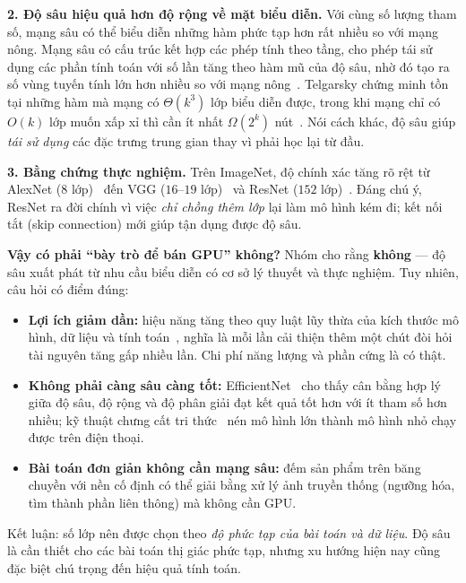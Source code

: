 \textbf{2. Độ sâu hiệu quả hơn độ rộng về mặt biểu diễn.} Với cùng số lượng tham số, mạng sâu có thể biểu diễn những hàm phức tạp hơn rất nhiều so với mạng nông. Mạng sâu có cấu trúc kết hợp các phép tính theo tầng, cho phép tái sử dụng các phần tính toán với số lần tăng theo hàm mũ của độ sâu, nhờ đó tạo ra số vùng tuyến tính lớn hơn nhiều so với mạng nông~\citep{montufar2014number}. Telgarsky chứng minh tồn tại những hàm mà mạng có $\Theta(k^3)$ lớp biểu diễn được, trong khi mạng chỉ có $O(k)$ lớp muốn xấp xỉ thì cần ít nhất $\Omega(2^k)$ nút~\citep{telgarsky2016benefits}. Nói cách khác, độ sâu giúp \emph{tái sử dụng} các đặc trưng trung gian thay vì phải học lại từ đầu.

\textbf{3. Bằng chứng thực nghiệm.} Trên ImageNet, độ chính xác tăng rõ rệt từ AlexNet ($8$ lớp)~\citep{krizhevsky2012imagenet} đến VGG ($16$--$19$ lớp)~\citep{simonyan2015very} và ResNet ($152$ lớp)~\citep{he2016deep}. Đáng chú ý, ResNet ra đời chính vì việc \emph{chỉ chồng thêm lớp} lại làm mô hình kém đi; kết nối tắt (skip connection) mới giúp tận dụng được độ sâu.

\textbf{Vậy có phải ``bày trò để bán GPU'' không?} Nhóm cho rằng \textbf{không} — độ sâu xuất phát từ nhu cầu biểu diễn có cơ sở lý thuyết và thực nghiệm. Tuy nhiên, câu hỏi có điểm đúng:
\begin{itemize}
    \item \textbf{Lợi ích giảm dần:} hiệu năng tăng theo quy luật lũy thừa của kích thước mô hình, dữ liệu và tính toán~\citep{kaplan2020scaling}, nghĩa là mỗi lần cải thiện thêm một chút đòi hỏi tài nguyên tăng gấp nhiều lần. Chi phí năng lượng và phần cứng là có thật.
    \item \textbf{Không phải càng sâu càng tốt:} EfficientNet~\citep{tan2019efficientnet} cho thấy cân bằng hợp lý giữa độ sâu, độ rộng và độ phân giải đạt kết quả tốt hơn với ít tham số hơn nhiều; kỹ thuật chưng cất tri thức~\citep{hinton2015distilling} nén mô hình lớn thành mô hình nhỏ chạy được trên điện thoại.
    \item \textbf{Bài toán đơn giản không cần mạng sâu:} đếm sản phẩm trên băng chuyền với nền cố định có thể giải bằng xử lý ảnh truyền thống (ngưỡng hóa, tìm thành phần liên thông) mà không cần GPU.
\end{itemize}
Kết luận: số lớp nên được chọn theo \emph{độ phức tạp của bài toán và dữ liệu}. Độ sâu là cần thiết cho các bài toán thị giác phức tạp, nhưng xu hướng hiện nay cũng đặc biệt chú trọng đến hiệu quả tính toán.
